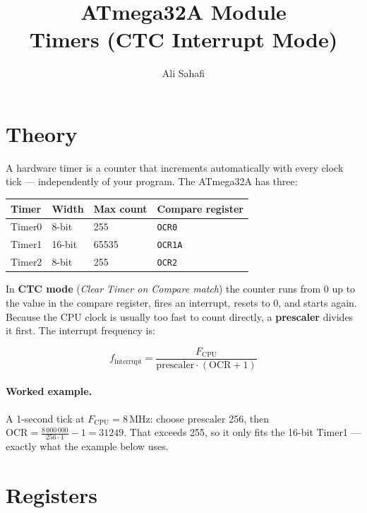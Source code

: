 \documentclass[11pt,a4paper]{article}
\title{ATmega32A Module \\ \Large Timers (CTC Interrupt Mode)}
\author{Ali Sahafi}
\date{}
\begin{document}
\maketitle

\section{Theory}

A hardware timer is a counter that increments automatically with every clock
tick --- independently of your program. The ATmega32A has three:

\begin{center}
\begin{tabular}{llll}
\toprule
\textbf{Timer} & \textbf{Width} & \textbf{Max count} & \textbf{Compare register} \\
\midrule
Timer0 & 8-bit  & 255    & \texttt{OCR0}  \\
Timer1 & 16-bit & 65535  & \texttt{OCR1A} \\
Timer2 & 8-bit  & 255    & \texttt{OCR2}  \\
\bottomrule
\end{tabular}
\end{center}

In \textbf{CTC mode} (\emph{Clear Timer on Compare match}) the counter runs
from 0 up to the value in the compare register, fires an interrupt, resets to
0, and starts again. Because the CPU clock is usually too fast to count
directly, a \textbf{prescaler} divides it first. The interrupt frequency is:

\begin{equation*}
f_{\text{interrupt}} = \frac{F_{\text{CPU}}}{\text{prescaler} \cdot (\text{OCR} + 1)}
\end{equation*}

\paragraph{Worked example.} A 1-second tick at $F_{\text{CPU}} = 8$\,MHz:
choose prescaler 256, then $\text{OCR} = \frac{8\,000\,000}{256 \cdot 1} - 1
= 31249$. That exceeds 255, so it only fits the 16-bit Timer1 --- exactly
what the example below uses.

\section{Registers}
\end{document}
